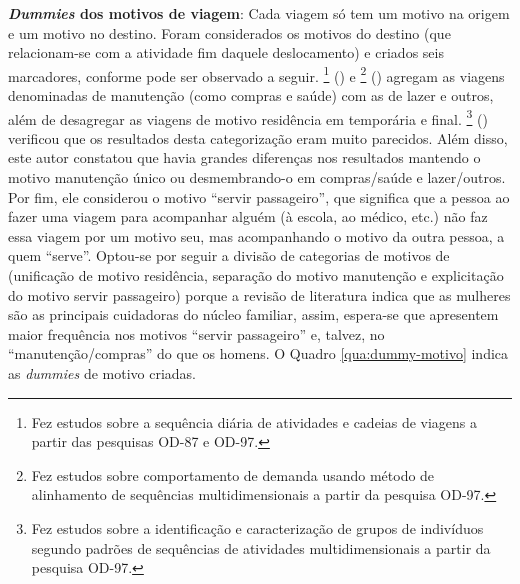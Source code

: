\begin{compactitem}
\item \textbf{\textit{Dummies} dos motivos de viagem}: Cada viagem só tem um motivo na origem e um motivo no destino.
Foram considerados os motivos do destino (que relacionam-se com a atividade fim daquele deslocamento) e criados seis marcadores, conforme pode ser observado a seguir. 
\footnote{Fez estudos sobre a sequência diária de atividades e cadeias de viagens a partir das pesquisas OD-87 e OD-97.} (\citeyear{VESPUCCI2003}) e \footnote{Fez estudos sobre comportamento de demanda usando método de alinhamento de sequências multidimensionais a partir da pesquisa OD-97.} (\citeyear{GERMANI2005}) agregam as viagens denominadas de manutenção  (como compras e saúde) com as de lazer e outros, além de desagregar as viagens de motivo residência em temporária e final. 
\footnote{Fez estudos sobre a identificação e caracterização de grupos de indivíduos segundo padrões de sequências de atividades multidimensionais a partir da pesquisa OD-97.} (\citeyear{DALMASO2009}) verificou que os resultados desta categorização eram muito parecidos.
Além disso, este autor constatou que havia grandes diferenças nos resultados mantendo o motivo manutenção único ou desmembrando-o em compras/saúde e lazer/outros.
Por fim, ele considerou o motivo ``servir passageiro'', que significa que a pessoa ao fazer uma viagem para acompanhar alguém (à escola, ao médico, etc.) não faz essa viagem por um motivo seu, mas acompanhando o motivo da outra pessoa, a quem ``serve''.
Optou-se por seguir a divisão de categorias de motivos de  (unificação de motivo residência, separação do motivo manutenção e explicitação do motivo servir passageiro) porque a revisão de literatura indica que as mulheres são as principais cuidadoras do núcleo familiar, assim, espera-se que apresentem maior frequência nos motivos ``servir passageiro'' e, talvez, no ``manutenção/compras'' do que os homens.
O Quadro \ref{qua:dummy-motivo} indica as \textit{dummies} de motivo criadas.


\end{compactitem}
